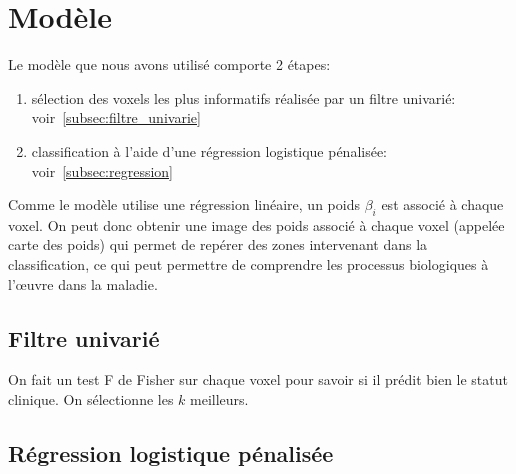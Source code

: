 \section{Modèle}

Le modèle que nous avons utilisé comporte 2 étapes:
\begin{enumerate}
 \item sélection des voxels les plus informatifs réalisée par un filtre univarié: voir~\autoref{subsec:filtre_univarie}
 \item classification à l'aide d'une régression logistique pénalisée: voir~\autoref{subsec:regression}
\end{enumerate}

Comme le modèle utilise une régression linéaire, un poids $\beta_i$ est associé à chaque voxel.
On peut donc obtenir une image des poids associé à chaque voxel (appelée carte des poids) qui permet de repérer des zones intervenant dans la classification, ce qui peut permettre de comprendre les processus biologiques à l'œuvre dans la maladie.

\subsection{Filtre univarié} \label{subsec:filtre_univarie}

On fait un test F de Fisher sur chaque voxel pour savoir si il prédit bien le statut clinique.
On sélectionne les $k$ meilleurs.

\subsection{Régression logistique pénalisée}  \label{subsec:regression}

